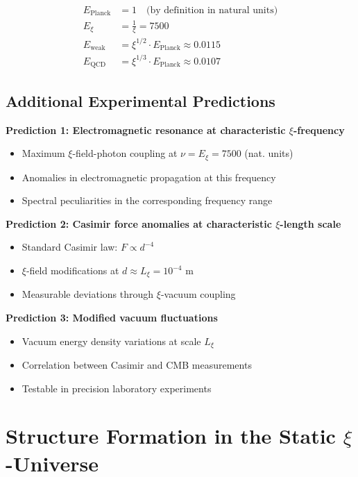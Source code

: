 \documentclass[12pt,a4paper]{report}
\begin{document}
	\begin{align}
		E_{\text{Planck}} &= 1 \quad \text{(by definition in natural units)} \\
		E_\xi &= \frac{1}{\xi} = 7500 \\
		E_{\text{weak}} &= \xi^{1/2} \cdot E_{\text{Planck}} \approx 0.0115 \\
		E_{\text{QCD}} &= \xi^{1/3} \cdot E_{\text{Planck}} \approx 0.0107
	\end{align}
	
	\subsection{Additional Experimental Predictions}
	
	\textbf{Prediction 1: Electromagnetic resonance at characteristic $\xi$-frequency}
	\begin{itemize}
		\item Maximum $\xi$-field-photon coupling at $\nu = E_\xi = 7500$ (nat. units)
		\item Anomalies in electromagnetic propagation at this frequency
		\item Spectral peculiarities in the corresponding frequency range
	\end{itemize}
	
	\textbf{Prediction 2: Casimir force anomalies at characteristic $\xi$-length scale}
	\begin{itemize}
		\item Standard Casimir law: $F \propto d^{-4}$
		\item $\xi$-field modifications at $d \approx L_\xi = 10^{-4}$ m
		\item Measurable deviations through $\xi$-vacuum coupling
	\end{itemize}
	
	\textbf{Prediction 3: Modified vacuum fluctuations}
	\begin{itemize}
		\item Vacuum energy density variations at scale $L_\xi$
		\item Correlation between Casimir and CMB measurements
		\item Testable in precision laboratory experiments
	\end{itemize}
	
	\section{Structure Formation in the Static $\xi$-Universe}
	
\end{document}
